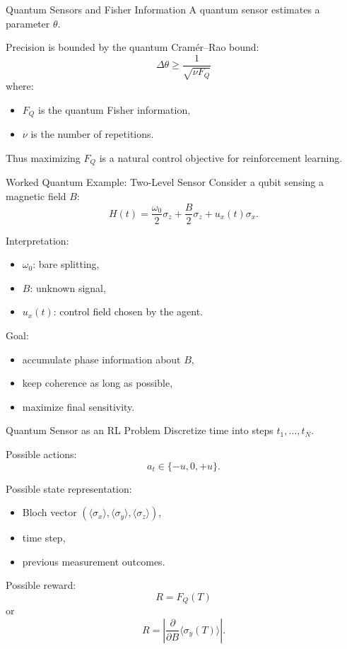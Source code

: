 \documentclass[aspectratio=169]{beamer}
\begin{document}
\begin{frame}{Quantum Sensors and Fisher Information}
  A quantum sensor estimates a parameter $\theta$.

  Precision is bounded by the quantum Cram\'er--Rao bound:
  \[
  \Delta \theta \ge \frac{1}{\sqrt{\nu F_Q}}
  \]
  where:
  \begin{itemize}
  \item $F_Q$ is the quantum Fisher information,
  \item $\nu$ is the number of repetitions.
  \end{itemize}

  Thus maximizing $F_Q$ is a natural control objective for reinforcement learning.
\end{frame}

\begin{frame}{Worked Quantum Example: Two-Level Sensor}
  Consider a qubit sensing a magnetic field $B$:
  \[
  H(t)=\frac{\omega_0}{2}\sigma_z + \frac{B}{2}\sigma_z + u_x(t)\sigma_x.
  \]

  Interpretation:
  \begin{itemize}
  \item $\omega_0$: bare splitting,
  \item $B$: unknown signal,
  \item $u_x(t)$: control field chosen by the agent.
  \end{itemize}

  Goal:
  \begin{itemize}
  \item accumulate phase information about $B$,
  \item keep coherence as long as possible,
  \item maximize final sensitivity.
  \end{itemize}
\end{frame}

\begin{frame}{Quantum Sensor as an RL Problem}
  Discretize time into steps $t_1,\dots,t_N$.

  Possible actions:
  \[
  a_t \in \{-u,0,+u\}.
  \]

  Possible state representation:
  \begin{itemize}
  \item Bloch vector $(\langle \sigma_x\rangle,\langle \sigma_y\rangle,\langle \sigma_z\rangle)$,
  \item time step,
  \item previous measurement outcomes.
  \end{itemize}

  Possible reward:
  \[
  R = F_Q(T)
  \]
  or
  \[
  R=\left|\frac{\partial}{\partial B}\langle \sigma_y(T)\rangle\right|.
  \]
\end{frame}
\end{document}
